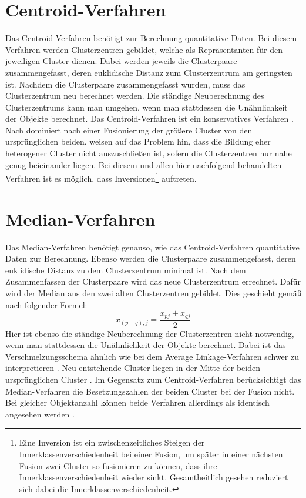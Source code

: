 \section{Centroid-Verfahren}
Das Centroid-Verfahren benötigt zur Berechnung quantitative Daten. Bei diesem Verfahren werden Clusterzentren gebildet, welche als Repräsentanten für den jeweiligen Cluster dienen. Dabei werden jeweils die Clusterpaare zusammengefasst, deren euklidische Distanz zum Clusterzentrum am geringsten ist. Nachdem die Clusterpaare zusammengefasst wurden, muss das Clusterzentrum neu berechnet werden. Die ständige Neuberechnung des Clusterzentrums kann man umgehen, wenn man stattdessen die Unähnlichkeit der Objekte berechnet. Das Centroid-Verfahren ist ein konservatives Verfahren \citep[Vgl.][S. 285-289]{Bacher.2010}. Nach \citet[S. 79]{Everitt.2011} dominiert nach einer Fusionierung der größere Cluster von den ursprünglichen beiden.
\citet[S. 243]{Eckey.2002} weisen auf das Problem hin, dass die Bildung eher heterogener Cluster nicht auszuschließen ist, sofern die Clusterzentren nur nahe genug beieinander liegen. Bei diesem und allen hier nachfolgend behandelten Verfahren ist es möglich, dass Inversionen\footnote{Eine Inversion ist ein zwischenzeitliches Steigen der Innerklassenverschiedenheit bei einer Fusion, um später in einer nächsten Fusion zwei Cluster so fusionieren zu können, dass ihre Innerklassenverschiedenheit wieder sinkt. Gesamtheitlich gesehen reduziert sich dabei die Innerklassenverschiedenheit.} auftreten.

\section{Median-Verfahren}
Das Median-Verfahren benötigt genauso, wie das Centroid-Verfahren quantitative Daten zur Berechnung. Ebenso werden die Clusterpaare zusammengefasst, deren euklidische Distanz zu dem Clusterzentrum minimal ist. Nach dem Zusammenfassen der Clusterpaare wird das neue Clusterzentrum errechnet. Dafür wird der Median aus den zwei alten Clusterzentren gebildet. Dies geschieht gemäß \citet[S. 286]{Bacher.2010} nach folgender Formel:
\begin{equation}
	x_{(p+q),j} = \frac{x_{pj} + x_{qj}}{2}
\end{equation}
Hier ist ebenso die ständige Neuberechnung der Clusterzentren nicht notwendig, wenn man stattdessen die Unähnlichkeit der Objekte berechnet. Dabei ist das Verschmelzungsschema ähnlich wie bei dem Average Linkage-Verfahren schwer zu interpretieren \citep[Vgl.][S. 285-289]{Bacher.2010}. Neu entstehende Cluster liegen in der Mitte der beiden ursprünglichen Cluster \citep[Vgl.][S. 79]{Everitt.2011}.
Im Gegensatz zum Centroid-Verfahren berücksichtigt das Median-Verfahren die Besetzungszahlen der beiden Cluster bei der Fusion nicht. Bei gleicher Objektanzahl können beide Verfahren allerdings als identisch angesehen werden \citep[Vgl.][S. 242]{Eckey.2002}.

